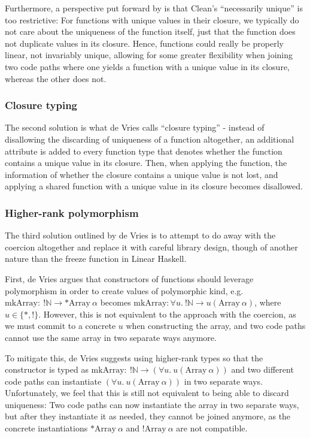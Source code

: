 Furthermore, a perspective put forward by \cite{sergey_linearity_2022} is that Clean's ``necessarily unique'' is too restrictive: For functions with unique values in their closure, we typically do not care about the uniqueness of the function itself, just that the function does not duplicate values in its closure. Hence, functions could really be properly linear, not invariably unique, allowing for some greater flexibility when joining two code paths where one yields a function with a unique value in its closure, whereas the other does not.

\subsubsection{Closure typing}
The second solution is what de Vries calls ``closure typing'' - instead of disallowing the discarding of uniqueness of a function altogether, an additional attribute is added to every function type that denotes whether the function contains a unique value in its closure. Then, when applying the function, the information of whether the closure contains a unique value is not lost, and applying a shared function with a unique value in its closure becomes disallowed.

\subsubsection{Higher-rank polymorphism}
The third solution outlined by de Vries is to attempt to do away with the coercion altogether and replace it with careful library design, though of another nature than the freeze function in Linear Haskell. 

First, de Vries argues that constructors of functions should leverage polymorphism in order to create values of polymorphic kind, e.g.\ $\mathrm{mkArray} :\ !\mathbb{N} \to *\mathrm{Array}\ \alpha$ becomes $\mathrm{mkArray} : \forall u.\ !\mathbb{N} \to u(\mathrm{Array}\ \alpha)$, where $u \in \{*, !\}$. However, this is not equivalent to the approach with the coercion, as we must commit to a concrete $u$ when constructing the array, and two code paths cannot use the same array in two separate ways anymore. 

To mitigate this, de Vries suggests using higher-rank types so that the constructor is typed as $\mathrm{mkArray} : \ !\mathbb{N} \to (\forall u.\ u(\mathrm{Array}\ \alpha))$ and two different code paths can instantiate $(\forall u.\ u(\mathrm{Array}\ \alpha))$ in two separate ways. Unfortunately, we feel that this is still not equivalent to being able to discard uniqueness: Two code paths can now instantiate the array in two separate ways, but after they instantiate it as needed, they cannot be joined anymore, as the concrete instantiations $*\mathrm{Array}\ \alpha$ and $!\mathrm{Array}\ \alpha$ are not compatible.


